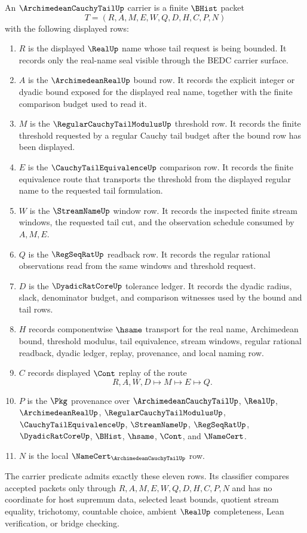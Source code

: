 \begin{definition}
\label{def:archimedean-cauchy-tail-carrier}
An $\ArchimedeanCauchyTailUp$ carrier is a finite $\BHist$ packet
$$
T=(R,A,M,E,W,Q,D,H,C,P,N)
$$
with the following displayed rows:
\begin{enumerate}
\item $R$ is the displayed $\RealUp$ name whose tail request is being bounded. It records only the real-name seal visible through the BEDC carrier surface.
\item $A$ is the $\ArchimedeanRealUp$ bound row. It records the explicit integer or dyadic bound exposed for the displayed real name, together with the finite comparison budget used to read it.
\item $M$ is the $\RegularCauchyTailModulusUp$ threshold row. It records the finite threshold requested by a regular Cauchy tail budget after the bound row has been displayed.
\item $E$ is the $\CauchyTailEquivalenceUp$ comparison row. It records the finite equivalence route that transports the threshold from the displayed regular name to the requested tail formulation.
\item $W$ is the $\StreamNameUp$ window row. It records the inspected finite stream windows, the requested tail cut, and the observation schedule consumed by $A,M,E$.
\item $Q$ is the $\RegSeqRatUp$ readback row. It records the regular rational observations read from the same windows and threshold request.
\item $D$ is the $\DyadicRatCoreUp$ tolerance ledger. It records the dyadic radius, slack, denominator budget, and comparison witnesses used by the bound and tail rows.
\item $H$ records componentwise $\hsame$ transport for the real name, Archimedean bound, threshold modulus, tail equivalence, stream windows, regular rational readback, dyadic ledger, replay, provenance, and local naming row.
\item $C$ records displayed $\Cont$ replay of the route
$$
R,A,W,D \longmapsto M \longmapsto E \longmapsto Q .
$$
\item $P$ is the $\Pkg$ provenance over $\ArchimedeanCauchyTailUp$, $\RealUp$, $\ArchimedeanRealUp$, $\RegularCauchyTailModulusUp$, $\CauchyTailEquivalenceUp$, $\StreamNameUp$, $\RegSeqRatUp$, $\DyadicRatCoreUp$, $\BHist$, $\hsame$, $\Cont$, and $\NameCert$.
\item $N$ is the local $\NameCert_{\ArchimedeanCauchyTailUp}$ row.
\end{enumerate}
The carrier predicate admits exactly these eleven rows. Its classifier compares accepted packets only through $R,A,M,E,W,Q,D,H,C,P,N$ and has no coordinate for host supremum data, selected least bounds, quotient stream equality, trichotomy, countable choice, ambient $\RealUp$ completeness, Lean verification, or bridge checking.
\end{definition}

